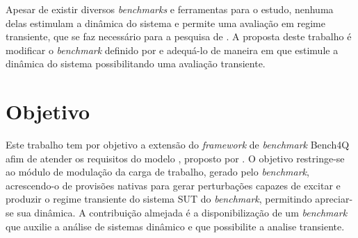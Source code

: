 Apesar de existir diversos \textit{benchmarks} e ferramentas para o estudo, nenhuma delas estimulam a dinâmica do sistema e permite uma avaliação em regime transiente, que se faz necessário para a pesquisa de . A proposta deste trabalho é modificar o \textit{benchmark} definido por  e adequá-lo de maneira em que estimule a dinâmica do sistema possibilitando uma avaliação transiente.


\section{Objetivo}
Este trabalho tem por objetivo a extensão do \textit{framework} de \textit{benchmark} Bench4Q afim de atender os requisitos do modelo \textit{}, proposto por . O objetivo restringe-se ao módulo de modulação da carga de trabalho, gerado pelo \textit{benchmark}, acrescendo-o de provisões nativas para gerar perturbações capazes de excitar e produzir o regime transiente do sistema SUT do \textit{benchmark}, permitindo apreciar-se sua dinâmica. A contribuição almejada é a disponibilização de um \textit{benchmark} que auxilie a análise de sistemas dinâmico e que possibilite a analise transiente.

